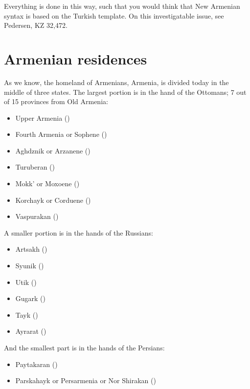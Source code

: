 Everything is done in this way, such that you would think that New Armenian syntax is based on the Turkish template. On this investigatable issue, see Pedersen, KZ 32,472. 




\chapter{Armenian residences}


\begin{adjarianpage}\label{page:25}\end{adjarianpage}%

As we know, the homeland of Armenians, Armenia, is divided today in the middle of three states. The largest portion is in the hand of the Ottomans; 7 out of 15 provinces from Old Armenia:\begin{itemize}
	\item Upper Armenia ()
	\item Fourth Armenia or Sophene ()
	\item Aghdznik or Arzanene ()
	\item Turuberan ()
	\item Mokk' or Moxoene ()
	\item Korchayk or Corduene ()
	\item Vaspurakan ()
\end{itemize}

A smaller portion is in the hands of the Russians: 
\begin{itemize}
	\item Artsakh ()
	\item Syunik ()
	\item Utik ()
	\item Gugark ()
	\item Tayk ()
	\item Ayrarat ()
\end{itemize}

And the smallest part is in the hands of the Persians:\begin{itemize}
	\item Paytakaran ()
	\item Parskahayk or Persarmenia or Nor Shirakan ()
\end{itemize} 

